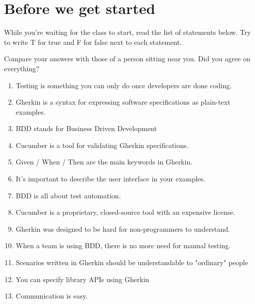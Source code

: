 \chapter*{Before we get started}

While you're waiting for the class to start, read the list of statements below. Try to write T for true and F for false next to each statement.

Compare your answers with those of a person sitting near you. Did you agree on everything?

\begin{enumerate}
\item Testing is something you can only do once developers are done coding.
\item Gherkin is a syntax for expressing software specifications as plain-text examples.
\item BDD stands for Business Driven Development
\item Cucumber is a tool for validating Gherkin specifications.
\item Given / When / Then are the main keywords in Gherkin.
\item It's important to describe the user interface in your examples.
\item BDD is all about test automation.
\item Cucumber is a proprietary, closed-source tool with an expensive license.
\item Gherkin was designed to be hard for non-programmers to understand.
\item When a team is using BDD, there is no more need for manual testing.
\item Scenarios written in Gherkin should be understandable to "ordinary" people
\item You can specify library APIs using Gherkin
\item Communication is easy.

\end{enumerate}